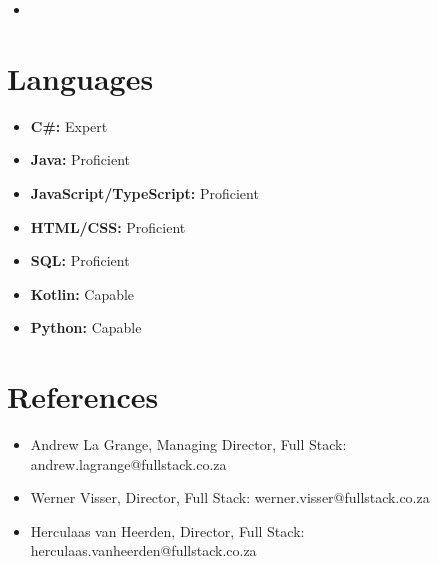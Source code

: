 \documentclass[11pt,a4paper,sans]{moderncv}
\begin{document}
\begin{itemize}

\item{}

\end{itemize}

\vspace{2pt}

\section{Languages}

\vspace{1pt}

\begin{itemize}

\item \textbf{C\#:} Expert 

\vspace{1pt}

\item \textbf{Java:} Proficient 

\vspace{1pt}

\item \textbf{JavaScript/TypeScript:} Proficient 

\vspace{1pt}

\item \textbf{HTML/CSS:} Proficient 

\vspace{1pt}

\item \textbf{SQL:} Proficient 

\vspace{1pt}

\item \textbf{Kotlin:} Capable 

\vspace{1pt}

\item \textbf{Python:} Capable 

\end{itemize}

\section{References}

\vspace{4pt}

\begin{itemize}

\item Andrew La Grange, Managing Director, Full Stack: andrew.lagrange@fullstack.co.za
\item Werner Visser, Director, Full Stack: werner.visser@fullstack.co.za
\item Herculaas van Heerden, Director, Full Stack: herculaas.vanheerden@fullstack.co.za

\end{itemize}

\nocite{*}


\end{document}

